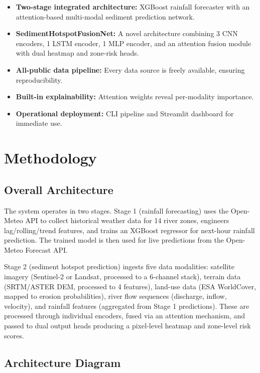 \documentclass[twocolumn]{article}
\begin{document}
\begin{itemize}
    \item \textbf{Two-stage integrated architecture:} XGBoost rainfall forecaster with an attention-based multi-modal sediment prediction network.
    \item \textbf{SedimentHotspotFusionNet:} A novel architecture combining 3 CNN encoders, 1 LSTM encoder, 1 MLP encoder, and an attention fusion module with dual heatmap and zone-risk heads.
    \item \textbf{All-public data pipeline:} Every data source is freely available, ensuring reproducibility.
    \item \textbf{Built-in explainability:} Attention weights reveal per-modality importance.
    \item \textbf{Operational deployment:} CLI pipeline and Streamlit dashboard for immediate use.
\end{itemize}

\section{Methodology}

\subsection{Overall Architecture}

The system operates in two stages. Stage 1 (rainfall forecasting) uses the Open-Meteo API to collect historical weather data for 14 river zones, engineers lag/rolling/trend features, and trains an XGBoost regressor for next-hour rainfall prediction. The trained model is then used for live predictions from the Open-Meteo Forecast API.

Stage 2 (sediment hotspot prediction) ingests five data modalities: satellite imagery (Sentinel-2 or Landsat, processed to a 6-channel stack), terrain data (SRTM/ASTER DEM, processed to 4 features), land-use data (ESA WorldCover, mapped to erosion probabilities), river flow sequences (discharge, inflow, velocity), and rainfall features (aggregated from Stage 1 predictions). These are processed through individual encoders, fused via an attention mechanism, and passed to dual output heads producing a pixel-level heatmap and zone-level risk scores.

\subsection{Architecture Diagram}
\end{document}
